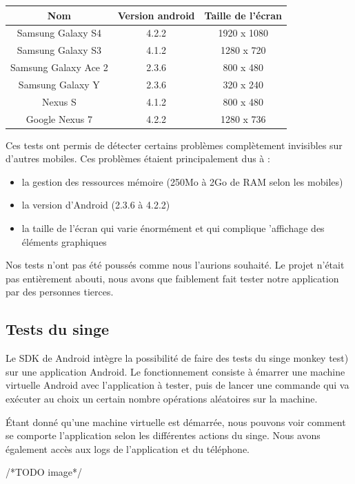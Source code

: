 \documentclass{report}
\begin{document}
\begin{center}
\begin{tabular}{|c|c|c|}
\hline
{\bf Nom} & {\bf Version android} & {\bf Taille de l'écran}\\
\hline
Samsung Galaxy S4 & 4.2.2 & 1920 x 1080\\
\hline
Samsung Galaxy S3 & 4.1.2 & 1280 x 720\\
\hline
Samsung Galaxy Ace 2 & 2.3.6 & 800 x 480\\
\hline
Samsung Galaxy Y & 2.3.6 & 320 x 240\\
\hline
Nexus S & 4.1.2 & 800 x 480\\
\hline
Google Nexus 7 & 4.2.2 & 1280 x 736\\
\hline
\end{tabular}
\end{center}
Ces tests ont permis de détecter certains problèmes complètement
invisibles sur d’autres mobiles. Ces problèmes étaient principalement
dus à :
\bigskip
\begin{itemize}
\item la gestion des ressources mémoire (250Mo à 2Go de RAM selon
les mobiles)
\item la version d’Android (2.3.6 à 4.2.2)
\item la taille de l’écran qui varie énormément et qui complique
’affichage des éléments graphiques
\end{itemize}
\bigskip

Nos tests n’ont pas été poussés comme nous l’aurions souhaité. Le
projet n’était pas entièrement abouti, nous avons que faiblement fait
tester notre application par des personnes tierces.

\subsection{Tests du singe}

Le SDK de Android intègre la possibilité de faire des tests du singe
monkey test) sur une application Android. Le fonctionnement consiste à
émarrer une machine virtuelle Android avec l’application à tester, puis
de lancer une commande qui va exécuter au choix un certain nombre
opérations aléatoires sur la machine.

Étant donné qu’une machine virtuelle est démarrée, nous pouvons voir
comment se comporte l’application selon les différentes actions du
singe. Nous avons également accès aux logs de l’application et du
téléphone.

/*TODO image*/
\end{document}
